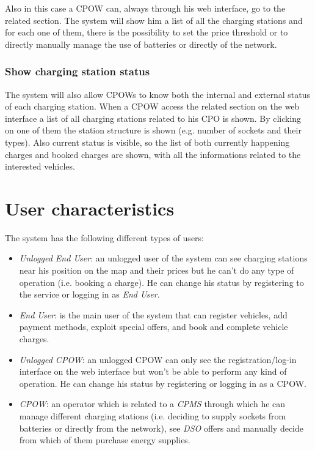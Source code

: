 \documentclass[a4paper]{report}
\begin{document}
Also in this case a CPOW can, always through his web interface, go to the related section. The system will show him a list of all the charging stations and for each one of them, there is the possibility to set the price threshold or to directly manually manage the use of batteries or directly of the network.
\subsubsection{Show charging station status}
The system will also allow CPOWs to know both the internal and external status of each charging station. When a CPOW access the related section on the web interface a list of all charging stations related to his CPO is shown. By clicking on one of them the station structure is shown (e.g. number of sockets and their types). Also current status is visible, so the list of both currently happening charges and booked charges are shown, with all the informations related to the interested vehicles.


\section{User characteristics}
The system has the following different types of users:
\begin{itemize}
\item \textit{Unlogged End User}: an unlogged user of the system can see charging stations near his position on the map and their prices but he can't do any type of operation (i.e. booking a charge). He can change his status by registering to the service or logging in as \textit{End User}.
\item \textit{End User}: is the main user of the system that can register vehicles, add payment methods, exploit special offers, and book and complete vehicle charges.
\item \textit{Unlogged CPOW}: an unlogged CPOW can only see the registration/log-in interface on the web interface but won't be able to perform any kind of operation. He can change his status by registering or logging in as a CPOW.
\item \textit{CPOW}: an operator which is related to a \textit{CPMS} through which he can manage different charging stations (i.e. deciding to supply sockets from batteries or directly from the network), see \textit{DSO} offers and manually decide from which of them purchase energy supplies.

\end{itemize}
\end{document}
